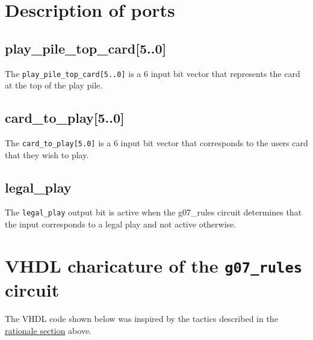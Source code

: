 \documentclass[12pt]{report}
\begin{document}
\section*{Description of ports}

\subsection*{play\_pile\_top\_card[5..0]}
The \texttt{play\_pile\_top\_card[5..0]} is a 6 input bit vector that represents the card at the top of the play pile.
\subsection*{card\_to\_play[5..0]}
The \texttt{card\_to\_play[5.0]} is a  6 input bit vector that corresponds to the users card that they wish to play.
\subsection*{legal\_play}
The \texttt{legal\_play} output bit is active when the g07\_rules circuit determines that the input corresponds to a legal play and not active otherwise. 

\section*{VHDL charicature of the \texttt{g07\_rules} circuit}
\label{s:vhdlrules}
The VHDL code shown below was inspired by the tactics described in the \hyperref[s:intro2]{rationale section} above.

\end{document}
